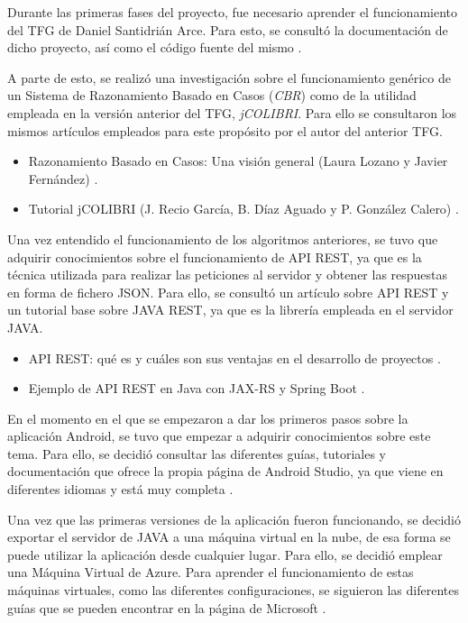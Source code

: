 Durante las primeras fases del proyecto, fue necesario aprender el funcionamiento del TFG de Daniel Santidrián Arce. Para esto, se consultó la documentación de dicho proyecto, así como el código fuente del mismo \cite{tfg:art}.

A parte de esto, se realizó una investigación sobre el funcionamiento genérico de un Sistema de Razonamiento Basado en Casos (\textit{CBR}) como de la utilidad empleada en la versión anterior del TFG, \textit{jCOLIBRI}. Para ello se consultaron los mismos artículos empleados para este propósito por el autor del anterior TFG.

\begin{itemize}
	\tightlist
	\item
	Razonamiento Basado en Casos: Una visión general (Laura Lozano y Javier Fernández) \cite{cbr:art}.
	\item 
	Tutorial jCOLIBRI (J. Recio García, B. Díaz Aguado y P. González Calero) \cite{colibri:tut}.
\end{itemize}

Una vez entendido el funcionamiento de los algoritmos anteriores, se tuvo que adquirir conocimientos sobre el funcionamiento de API REST, ya que es la técnica utilizada para realizar las peticiones al servidor y obtener las respuestas en forma de fichero JSON. Para ello, se consultó un artículo sobre API REST y un tutorial base sobre JAVA REST, ya que es la librería empleada en el servidor JAVA.

\begin{itemize}
	\tightlist
	\item
	API REST: qué es y cuáles son sus ventajas en el desarrollo de proyectos \cite{rest:info}.
	\item 
	Ejemplo de API REST en Java con JAX-RS y Spring Boot \cite{javarest:tut}.
\end{itemize}

En el momento en el que se empezaron a dar los primeros pasos sobre la aplicación Android, se tuvo que empezar a adquirir conocimientos sobre este tema. Para ello, se decidió consultar las diferentes guías, tutoriales y documentación que ofrece la propia página de Android Studio, ya que viene en diferentes idiomas y está muy completa \cite{androidstudio:info}.

Una vez que las primeras versiones de la aplicación fueron funcionando, se decidió exportar el servidor de JAVA a una máquina virtual en la nube, de esa forma se puede utilizar la aplicación desde cualquier lugar. Para ello, se decidió emplear una Máquina Virtual de Azure. Para aprender el funcionamiento de estas máquinas virtuales, como las diferentes configuraciones, se siguieron las diferentes guías que se pueden encontrar en la página de Microsoft \cite{azure:foro}.

